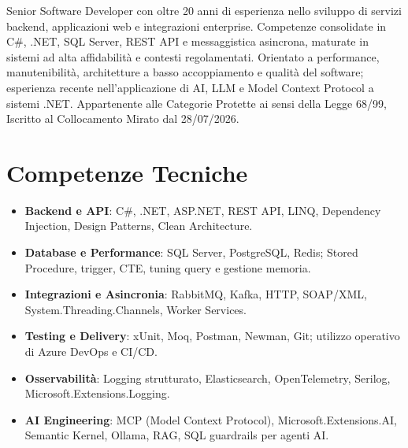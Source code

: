 \documentclass[11pt,a4paper,sans]{moderncv}
\begin{document}
\makecvtitle


\vspace{6pt}
\small{Senior Software Developer con oltre 20 anni di esperienza nello sviluppo di servizi backend, applicazioni web e integrazioni enterprise. Competenze consolidate in C\#, .NET, SQL Server, REST API e messaggistica asincrona, maturate in sistemi ad alta affidabilità e contesti regolamentati. Orientato a performance, manutenibilità, architetture a basso accoppiamento e qualità del software; esperienza recente nell’applicazione di AI, LLM e Model Context Protocol a sistemi .NET. Appartenente alle Categorie Protette ai sensi della Legge 68/99, Iscritto al Collocamento Mirato dal 28/07/2026.}


\section{Competenze Tecniche}
\vspace{1pt}
\begin{itemize}

\item \textbf{Backend e API}: C\#, .NET, ASP.NET, REST API, LINQ, Dependency Injection, Design Patterns, Clean Architecture.

\item \textbf{Database e Performance}: SQL Server, PostgreSQL, Redis; Stored Procedure, trigger, CTE, tuning query e gestione memoria.

\item \textbf{Integrazioni e Asincronia}: RabbitMQ, Kafka, HTTP, SOAP/XML, System.Threading.Channels, Worker Services.

\item \textbf{Testing e Delivery}: xUnit, Moq, Postman, Newman, Git; utilizzo operativo di Azure DevOps e CI/CD.

\item \textbf{Osservabilità}: Logging strutturato, Elasticsearch, OpenTelemetry, Serilog, Microsoft.Extensions.Logging.

\item \textbf{AI Engineering}: MCP (Model Context Protocol), Microsoft.Extensions.AI, Semantic Kernel, Ollama, RAG, SQL guardrails per agenti AI.

\end{itemize}
\end{document}
